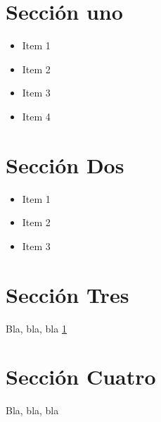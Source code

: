 
\section{Sección uno}
\label{1:sec:1}

\begin{itemize}
  \item Item 1 \cite{Bay1}
  \item Item 2
  \item Item 3
  \item Item 4
\end{itemize}

\section{Sección Dos}
\label{1:sec:2}

\begin{itemize}
  \item Item 1
  \item Item 2
  \item Item 3
\end{itemize}

\section{Sección Tres}
\label{1:sec:3}

Bla, bla, bla  \ref{1:sec:1}

\section{Sección Cuatro}
\label{1:sec:4}

Bla, bla, bla

